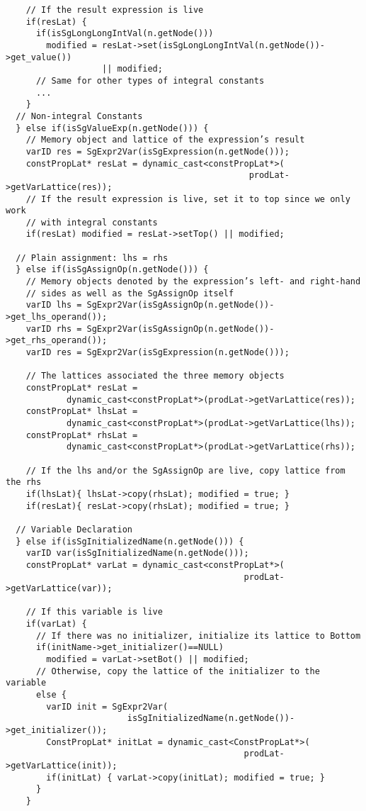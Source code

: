 {\begin{frame}
\begin{lstlisting}
    // If the result expression is live
    if(resLat) {
      if(isSgLongLongIntVal(n.getNode()))
        modified = resLat->set(isSgLongLongIntVal(n.getNode())->get_value()) 
                   || modified;
      // Same for other types of integral constants 
      ...
    }
  // Non-integral Constants
  } else if(isSgValueExp(n.getNode())) {
    // Memory object and lattice of the expression’s result
    varID res = SgExpr2Var(isSgExpression(n.getNode()));
    constPropLat* resLat = dynamic_cast<constPropLat*>(
                                                prodLat->getVarLattice(res));
    // If the result expression is live, set it to top since we only work 
    // with integral constants
    if(resLat) modified = resLat->setTop() || modified;

  // Plain assignment: lhs = rhs
  } else if(isSgAssignOp(n.getNode())) {
    // Memory objects denoted by the expression’s left- and right-hand   
    // sides as well as the SgAssignOp itself
    varID lhs = SgExpr2Var(isSgAssignOp(n.getNode())->get_lhs_operand());
    varID rhs = SgExpr2Var(isSgAssignOp(n.getNode())->get_rhs_operand());
    varID res = SgExpr2Var(isSgExpression(n.getNode()));

    // The lattices associated the three memory objects
    constPropLat* resLat = 
            dynamic_cast<constPropLat*>(prodLat->getVarLattice(res));
    constPropLat* lhsLat = 
            dynamic_cast<constPropLat*>(prodLat->getVarLattice(lhs));
    constPropLat* rhsLat = 
            dynamic_cast<constPropLat*>(prodLat->getVarLattice(rhs));

    // If the lhs and/or the SgAssignOp are live, copy lattice from the rhs
    if(lhsLat){ lhsLat->copy(rhsLat); modified = true; }    
    if(resLat){ resLat->copy(rhsLat); modified = true; }    

  // Variable Declaration
  } else if(isSgInitializedName(n.getNode())) {
    varID var(isSgInitializedName(n.getNode()));
    constPropLat* varLat = dynamic_cast<constPropLat*>(
                                               prodLat->getVarLattice(var));

    // If this variable is live
    if(varLat) {
      // If there was no initializer, initialize its lattice to Bottom
      if(initName->get_initializer()==NULL)
        modified = varLat->setBot() || modified;
      // Otherwise, copy the lattice of the initializer to the variable
      else {
        varID init = SgExpr2Var(
                        isSgInitializedName(n.getNode())->get_initializer());
        ConstPropLat* initLat = dynamic_cast<ConstPropLat*>(
                                               prodLat->getVarLattice(init));
        if(initLat) { varLat->copy(initLat); modified = true; }
      }
    }


\end{lstlisting}
\end{frame}}
